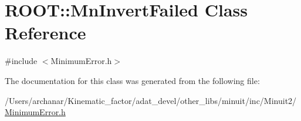 \hypertarget{classROOT_1_1Minuit2_1_1MinimumError_1_1MnInvertFailed}{}\section{R\+O\+OT\+:\+:Mn\+Invert\+Failed Class Reference}
\label{classROOT_1_1Minuit2_1_1MinimumError_1_1MnInvertFailed}


{\ttfamily \#include $<$Minimum\+Error.\+h$>$}



The documentation for this class was generated from the following file\+:\begin{DoxyCompactItemize}
\item 
/\+Users/archanar/\+Kinematic\+\_\+factor/adat\+\_\+devel/other\+\_\+libs/minuit/inc/\+Minuit2/\mbox{\hyperlink{other__libs_2minuit_2inc_2Minuit2_2MinimumError_8h}{Minimum\+Error.\+h}}\end{DoxyCompactItemize}

